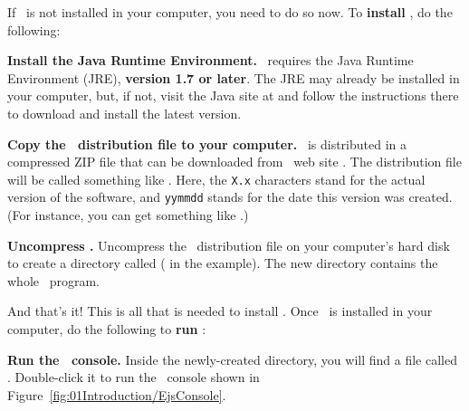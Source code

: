 If \Ejs\ is not installed in your computer, you need to do so now. To \textbf{install} \ejs, do the following:

\begin{numberlist}

\item \textbf{Install the Java Runtime Environment.} \ejs\ requires the Java Runtime Environment (JRE), \textbf{version 1.7 or later}.
The JRE may already be installed in your computer, but, if not, visit the Java site at  and follow the instructions there
to download and install the latest version.

\item \textbf{Copy the \ejs\ distribution file to your computer.} \ejs\ is distributed in a compressed ZIP file that can be downloaded from \ejs\ web site . The distribution file will be called something like . 
Here, the \texttt{X.x} characters stand for the actual version of the software, and \texttt{yymmdd} stands for the date this version was created. (For instance, you can get something like .)

\item \textbf{Uncompress \ejs.} Uncompress the \ejs\ distribution file on your computer's hard disk to create a directory called  ( in the example). The new directory contains the whole \ejs\ program.
\end{numberlist}

And that's it! This is all that is needed to install \ejs. Once \Ejs\ is installed in your computer, do the following to \textbf{run} \ejs:

\begin{description}
\item \textbf{Run the \ejs\ console.} Inside the newly-created  directory, you will find a file called
. Double-click it to run the
\ejs\ console shown in Figure~\ref{fig:01Introduction/EjsConsole}.
\end{description}

